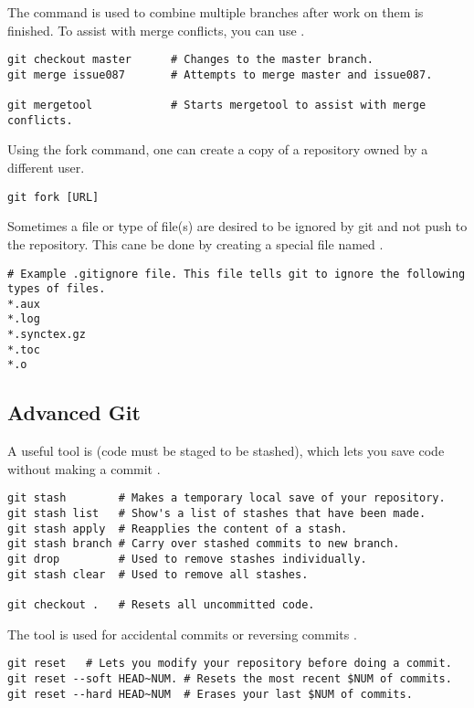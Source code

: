 The  command is used to combine multiple branches after work on them is finished. To assist with merge conflicts, you can use .
\begin{lstlisting}[style=terminalstyle]
git checkout master      # Changes to the master branch.
git merge issue087       # Attempts to merge master and issue087.

git mergetool            # Starts mergetool to assist with merge conflicts.
\end{lstlisting}

Using the fork command, one can create a copy of a repository owned by a different user.
\begin{lstlisting}[style=terminalstyle]
git fork [URL]
\end{lstlisting}

Sometimes a file or type of file(s) are desired to be ignored by git and not push to the repository. This cane be done by creating a special file named .
\begin{lstlisting}
# Example .gitignore file. This file tells git to ignore the following types of files.
*.aux
*.log
*.synctex.gz
*.toc
*.o
\end{lstlisting}








\subsection{Advanced Git}

A useful tool is  (code must be staged to be stashed), which lets you save code without making a commit \cite{git}\cite{git: Advanced}.
\begin{lstlisting}[style=terminalstyle]
git stash        # Makes a temporary local save of your repository.
git stash list   # Show's a list of stashes that have been made.
git stash apply  # Reapplies the content of a stash.
git stash branch # Carry over stashed commits to new branch.
git drop         # Used to remove stashes individually.
git stash clear  # Used to remove all stashes.

git checkout .   # Resets all uncommitted code.
\end{lstlisting}

The  tool is used for accidental commits or reversing commits \cite{git}\cite{git: Advanced}.
\begin{lstlisting}[style=terminalstyle]
git reset   # Lets you modify your repository before doing a commit.
git reset --soft HEAD~NUM. # Resets the most recent $NUM of commits.
git reset --hard HEAD~NUM  # Erases your last $NUM of commits.
\end{lstlisting}

